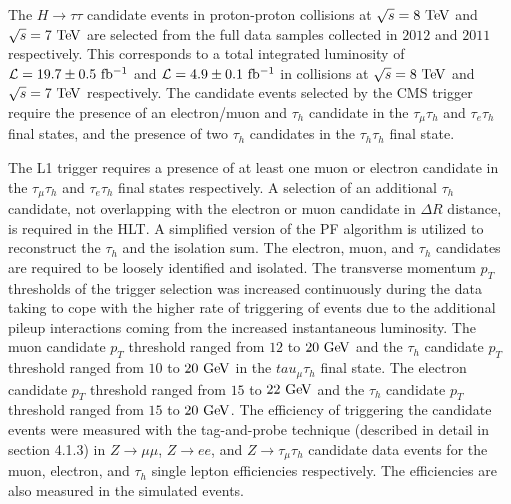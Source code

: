The $H \rightarrow \tau\tau$ candidate events in proton-proton collisions at $\sqrt{s}=8~\mathrm{Te\kern -0.1em V}$ and $\sqrt{s}=7~\mathrm{Te\kern -0.1em V}$ are selected from the full data samples collected in $2012$ and $2011$ respectively. This corresponds to a total integrated luminosity of $\mathcal{L}=19.7\pm0.5~\mathrm{fb^{-1}}$ and  $\mathcal{L}=4.9\pm0.1~\mathrm{fb^{-1}}$ in collisions at $\sqrt{s}=8~\mathrm{Te\kern -0.1em V}$ and $\sqrt{s}=7~\mathrm{Te\kern -0.1em V}$ respectively. The candidate events selected by the CMS trigger require the presence of an electron/muon and $\tau_h$ candidate in the $\tau_{\mu}\tau_{h}$ and $\tau_{e}\tau_{h}$ final states, and the presence of two $\tau_h$ candidates in the  $\tau_{h}\tau_{h}$ final state.

The L1 trigger requires a presence of at least one muon or electron candidate in the $\tau_{\mu}\tau_{h}$ and $\tau_{e}\tau_{h}$ final states respectively. A selection of an additional $\tau_h$ candidate, not overlapping with the electron or muon candidate in $\Delta R$ distance, is required in the HLT.  A simplified version of the PF algorithm is utilized to reconstruct the $\tau_h$ and the isolation sum. The  electron, muon, and $\tau_h$ candidates are required to be loosely identified and isolated. The transverse momentum $p_{T}$ thresholds of the trigger selection was increased continuously during the data taking to cope with the higher rate of triggering of events due to the additional pileup interactions coming from the increased instantaneous luminosity. The muon candidate $p_{T}$ threshold ranged from $12$ to $20~\mathrm{Ge\kern -0.1em V}$ and the $\tau_h$ candidate $p_{T}$  threshold ranged from $10$ to $20~\mathrm{Ge\kern -0.1em V}$ in the $tau_{\mu}\tau_{h}$ final state. The electron candidate $p_{T}$ threshold ranged from $15$ to $22~\mathrm{Ge\kern -0.1em V}$ and the $\tau_h$ candidate  $p_{T}$  threshold ranged from $15$ to $20~\mathrm{Ge\kern -0.1em V}$. The efficiency of triggering the candidate events were measured with the tag-and-probe technique (described in detail in section 4.1.3) in $Z \rightarrow \mu\mu$,  $Z \rightarrow ee$, and $Z \rightarrow \tau_{\mu}\tau_h$ candidate data events for the muon, electron, and $\tau_h$ single lepton efficiencies respectively. The efficiencies are also measured in the simulated events. 

